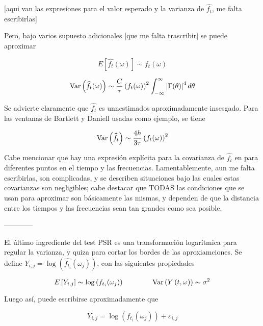 [aqui van las expresiones para el valor esperado y la varianza de $\widehat{f_t}$, me falta
escribirlas]

Pero, bajo varios supuesto adicionales [que me falta trascribir] se puede aproximar

\begin{equation*}
E\left[ \widehat{f_t}(\omega) \right] \sim f_t(\omega)
\end{equation*}

\begin{equation*}
\mathrm{Var}\left( \widehat{f_t}(\omega) \right) 
\sim 
\frac{C}{\tau} \left(f_t(\omega)\right)^{2} \int_{-\infty}^{\infty} \left| \Gamma(\theta) \right|^{4} d\theta
\end{equation*}

Se advierte claramente que $\widehat{f_t}$ es unnestimados aproximadamente insesgado.
Para las ventanas de Bartlett y Daniell usadas como ejemplo, se tiene

\begin{equation*}
\mathrm{Var}\left( \widehat{f_t} \right) 
\sim 
\frac{4h}{3\tau} \left(f_t(\omega)\right)^{2}
\end{equation*}

Cabe mencionar que hay una expresi\'on expl\'icita para la covarianza de $\widehat{f_t}$
en para diferentes puntos en el tiempo y las frecuencias. Lamentablemente,
aun me falta escribirlas, son complicadas, y se describen situaciones bajo las
cuales estas covarianzas son negligibles; cabe destacar que TODAS las condiciones 
que se usan para aproximar son b\'asicamente las mismas, y dependen de que la distancia
entre los tiempos y las frecuencias sean tan grandes como sea posible.

------------

El \'ultimo ingrediente del test PSR es una transformaci\'on logar\'itmica
para regular la varianza, y quiza para cortar los bordes de las aproxiamciones.
Se define $Y_{i,j} = \log \left( \widehat{f_{t_i}}(\omega_j) \right)$, con las siguientes propiedades

\begin{equation*}
E\left[ Y_{i,j} \right] \thicksim \log \left( f_{t_i}(\omega_j) \right)
\hspace{4em}
\text{Var}\left( {Y\left(t,\omega\right)}\right) \thicksim \sigma^{2}
\end{equation*}

Luego as\'i, puede escribirse aproximadamente que

$$Y_{i,j} = \log \left( f_{t_i}(\omega_j) \right) + \varepsilon_{i,j}$$

